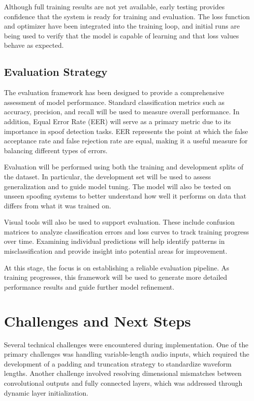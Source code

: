 \documentclass[conference]{IEEEtran}
\begin{document}
Although full training results are not yet available, early
testing provides confidence that the system is ready for training
and evaluation. The loss function and optimizer have been
integrated into the training loop, and initial runs are being
used to verify that the model is capable of learning and that
loss values behave as expected.

\subsection{Evaluation Strategy}

The evaluation framework has been designed to provide a
comprehensive assessment of model performance. Standard
classification metrics such as accuracy, precision, and recall
will be used to measure overall performance. In addition,
Equal Error Rate (EER) will serve as a primary metric due
to its importance in spoof detection tasks. EER represents the
point at which the false acceptance rate and false rejection rate
are equal, making it a useful measure for balancing different
types of errors.

Evaluation will be performed using both the training and development
splits of the dataset. In particular, the development
set will be used to assess generalization and to guide model
tuning. The model will also be tested on unseen spoofing
systems to better understand how well it performs on data
that differs from what it was trained on.

Visual tools will also be used to support evaluation. These
include confusion matrices to analyze classification errors
and loss curves to track training progress over time. Examining
individual predictions will help identify patterns in
misclassification and provide insight into potential areas for
improvement.

At this stage, the focus is on establishing a reliable evaluation
pipeline. As training progresses, this framework will be
used to generate more detailed performance results and guide
further model refinement.

\section{Challenges and Next Steps}

Several technical challenges were encountered during implementation.
One of the primary challenges was handling
variable-length audio inputs, which required the development
of a padding and truncation strategy to standardize waveform
lengths. Another challenge involved resolving dimensional
mismatches between convolutional outputs and fully connected
layers, which was addressed through dynamic layer
initialization.
\end{document}
